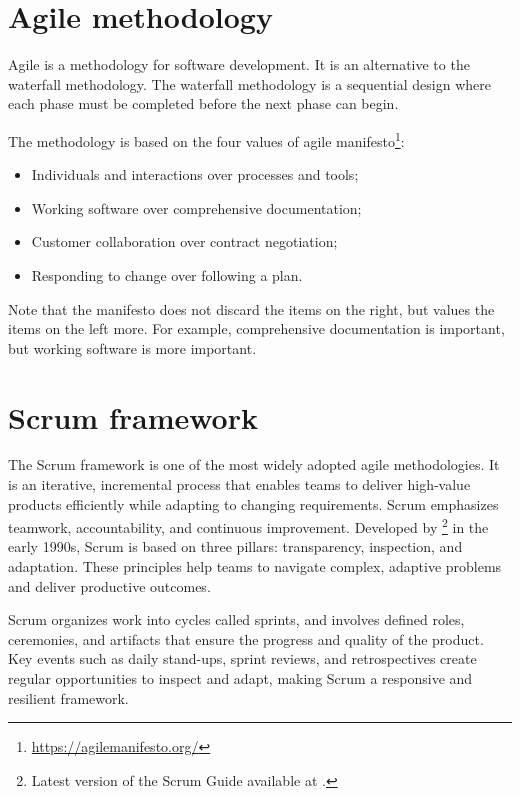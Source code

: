 \section{Agile methodology}

Agile is a methodology for software development.  It is an alternative to the waterfall
methodology.  The waterfall methodology is a sequential design where each phase
must be completed before the next phase can begin.

The methodology is based on the four values of agile manifesto\footnote{\url{https://agilemanifesto.org/}}:
\begin{itemize}
  \itemsep0em
  \item Individuals and interactions over processes and tools;
  \item Working software over comprehensive documentation;
  \item Customer collaboration over contract negotiation;
  \item Responding to change over following a plan.
\end{itemize}

Note that the manifesto does not discard the items on the right, but values the items on
the left more.  For example, comprehensive documentation is important, but working software
is more important.

\section{Scrum framework}

The Scrum framework is one of the most widely adopted agile methodologies. It is an
iterative, incremental process that enables teams to deliver high-value products
efficiently while adapting to changing requirements. Scrum emphasizes teamwork,
accountability, and continuous improvement. Developed by \citeauthor{schwaber2020scrum}%
\footnote{Latest version of the Scrum Guide available at .}
in the early 1990s, Scrum is based on three pillars: transparency, inspection, and
adaptation. These principles help teams to navigate complex, adaptive problems and deliver
productive outcomes.

Scrum organizes work into cycles called sprints, and involves defined roles, ceremonies,
and artifacts that ensure the progress and quality of the product. Key events such as
daily stand-ups, sprint reviews, and retrospectives create regular opportunities to inspect
and adapt, making Scrum a responsive and resilient framework.

